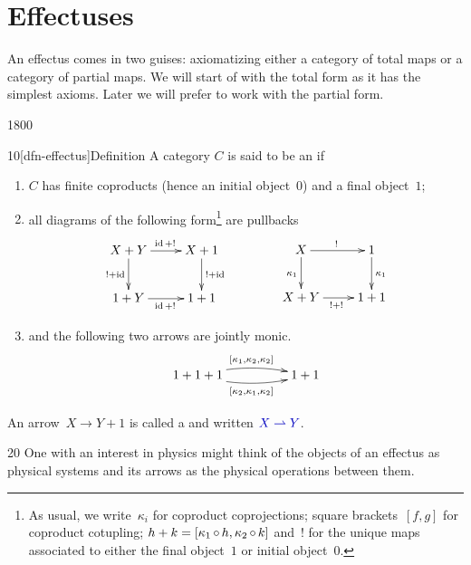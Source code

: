 \section{Effectuses}
An effectus comes in two guises:
    axiomatizing either a category of total maps
    or a category of partial maps.
We will start of with the total form as it has the simplest axioms.
Later we will prefer to work with the partial form.
\begin{parsec}{1800}%
\begin{point}{10}[dfn-effectus]{Definition}%
A category $C$ is said to be an 
    \cite{effintro,newdirections,statesofconvexsets}
    if
\begin{enumerate}
\item $C$ has finite coproducts (hence an initial object~$0$)
        and a final object~$1$;
    \item all diagrams of the following form\footnote{%
    As usual,
        we write~$\kappa_i$ for coproduct coprojections;
            square brackets~$[f,g]$ for coproduct cotupling;
            $h+k = [\kappa_1 \mathop{\circ} h, \kappa_2 \mathop{\circ} k]$
            and~$!$ for the unique maps associated to
            either the final object~$1$ or initial object~$0$.} are pullbacks
\begin{equation}\label{pullbacks}
    \vcenter{\xymatrix{
    X+Y \ar[r]^{\id+!} \ar[d]_{!+\id} & X+1\ar[d]^{!+\id} \\
    1+Y\ar[r]_{\id+!} & 1+1
}}
    \qquad\qquad
    \vcenter{\xymatrix{
    X \ar[r]^{!} \ar[d]_{\kappa_1} & 1 \ar[d]^{\kappa_1} \\
    X+Y\ar[r]_{!+!} & 1+1
}}
\end{equation}
\item\label{eff-joint-monicity} and the following two arrows are jointly monic.
    \begin{equation*}
        \xymatrix@C+2pc  {
            1+1+1  \ar@/^/[r]^{[\kappa_1,\kappa_2,\kappa_2]}
                    \ar@/_/[r]_{[\kappa_2,\kappa_1,\kappa_2]} & 1+1
        }
    \end{equation*}
\end{enumerate}
An arrow~$X \to Y+1$ is called a  and written
    $\Define{X \pto Y}$.
\begin{point}{20}%
One with an interest in physics might think of the objects
    of an effectus as physical systems and its arrows as
    the physical operations between them.

\end{point}
\end{point}
\end{parsec}
